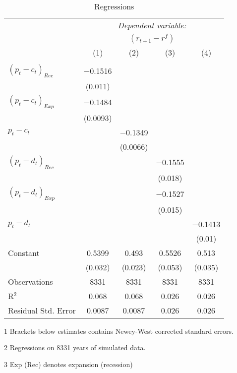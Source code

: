 \begin{table}[H]
\centering   
  \caption{Regressions}           
  \label{tab:regress}     
  \begin{threeparttable}
\begin{tabular}{@{\hspace{5pt}}l@{\hspace{5pt}}cccc} 
\toprule 
 & \multicolumn{4}{c}{\textit{Dependent variable:}} \\ 
 & \multicolumn{4}{c}{$\left(r_{t+1}-r^f\right)$} \\ 
 \cmidrule(rr){2-5}
 & (1)   &   (2) &   (3) &  (4)\\ 
\midrule  
\\[-2.1ex] $\left( p_t - c_t \right)_{Rec}$ & $-$0.1516& &  \\ 
  & (0.011) & & & \\ 
 \addlinespace 
  $\left( p_t - c_t \right)_{Exp}$ & $-$0.1484 & &  \\ 
  & (0.0093) & & &\\ 
 \addlinespace 
 $p_t - c_t$ &  & $-$0.1349 & & \\
 & & (0.0066) \\
 \addlinespace 
  $\left( p_t - d_t \right)_{Rec}$ & & & $-$0.1555&  \\ 
  & & & (0.018)    &\\ 
 \addlinespace 
  $\left( p_t - d_t \right)_{Exp}$ & & & $-$0.1527&  \\ 
  &  & & (0.015) &\\ 
 \addlinespace 
 $p_t - d_t$ & & & & $-$0.1413 \\
 & & & &  (0.01)  \\
 \addlinespace 
 Constant &0.5399 &0.493 &0.5526 &0.513 \\ 
  &(0.032) &(0.023) &(0.053) &(0.035) \\ 
 \addlinespace 
\midrule  
Observations & 8331 & 8331 & 8331 &8331\\ 
R$^{2}$ &0.068 & 0.068 & 0.026 &0.026\\ 
Residual Std. Error &0.0087 & 0.0087 &0.026 & 0.026  \\ 
\bottomrule 
\end{tabular} 
\begin{tablenotes}
\footnotesize{
\item[1] Brackets below estimates contains Newey-West corrected standard errors. 
\item[2] Regressions on 8331 years of simulated data.
\item[3] Exp (Rec) denotes expansion (recession)
}
\end{tablenotes}
\end{threeparttable}
\end{table} 
